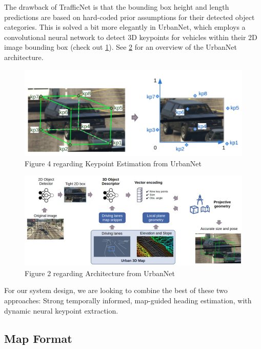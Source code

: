 \documentclass[RAIstudentexpose%
              ,optBibtex%
              ,optBibstyleAlphabetic%
              ,optEnglish%
              ]{RAIlatex}%
\begin{document}
The drawback of TrafficNet is that the bounding box height and length predictions are based on hard-coded prior assumptions for their detected object categories. This is solved a bit more elegantly in UrbanNet, which employs a convolutional neural network to detect 3D keypoints for vehicles within their 2D image bounding box (check out \cref{fig:keypoints}). See \cref{fig:urbnet} for an overview of the UrbanNet architecture. \par

\begin{figure}[htb]%
    \centering
    \includegraphics[width=120mm]{keypoints}
    \caption{Figure 4 regarding Keypoint Estimation from UrbanNet \cite{urbannet2021}}
    \label{fig:keypoints}%
\end{figure}%

\begin{figure}[htb]%
    \centering
    \includegraphics[width=120mm]{urbnet}
    \caption{Figure 2 regarding Architecture from UrbanNet \cite{urbannet2021}}
    \label{fig:urbnet}%
\end{figure}%

For our system design, we are looking to combine the best of these two approaches: Strong temporally informed, map-guided heading estimation, with dynamic neural keypoint extraction. \par

\subsection{Map Format}
\end{document}
